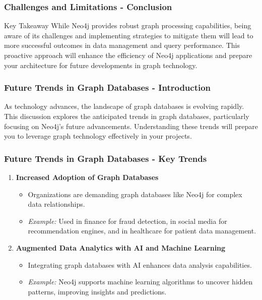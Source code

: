 \documentclass[aspectratio=169]{beamer}
\begin{document}
\begin{frame}[fragile]
    \frametitle{Challenges and Limitations - Conclusion}
    \begin{block}{Key Takeaway}
        While Neo4j provides robust graph processing capabilities, being aware of its challenges and implementing strategies to mitigate them will lead to more successful outcomes in data management and query performance. This proactive approach will enhance the efficiency of Neo4j applications and prepare your architecture for future developments in graph technology.
    \end{block}
\end{frame}

\begin{frame}[fragile]
    \frametitle{Future Trends in Graph Databases - Introduction}
    As technology advances, the landscape of graph databases is evolving rapidly. 
    This discussion explores the anticipated trends in graph databases, particularly focusing on Neo4j's future advancements. 
    Understanding these trends will prepare you to leverage graph technology effectively in your projects.
\end{frame}

\begin{frame}[fragile]
    \frametitle{Future Trends in Graph Databases - Key Trends}
    \begin{enumerate}
        \item \textbf{Increased Adoption of Graph Databases}
        \begin{itemize}
            \item Organizations are demanding graph databases like Neo4j for complex data relationships.
            \item \textit{Example:} Used in finance for fraud detection, in social media for recommendation engines, and in healthcare for patient data management.
        \end{itemize}
        
        \item \textbf{Augmented Data Analytics with AI and Machine Learning}
        \begin{itemize}
            \item Integrating graph databases with AI enhances data analysis capabilities.
            \item \textit{Example:} Neo4j supports machine learning algorithms to uncover hidden patterns, improving insights and predictions.
        \end{itemize}
    \end{enumerate}
\end{frame}
\end{document}
